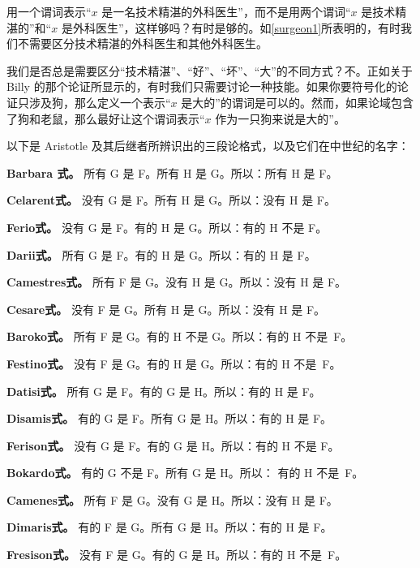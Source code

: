 用一个谓词表示“$x$ 是一名技术精湛的外科医生”，而不是用两个谓词“$x$ 是技术精湛的”和“$x$ 是外科医生”，这样够吗？有时是够的。如\cref{surgeon1}所表明的，有时我们不需要区分技术精湛的外科医生和其他外科医生。

我们是否总是需要区分“技术精湛”、“好”、“坏”、“大”的不同方式？不。正如关于 Billy 的那个论证所显示的，有时我们只需要讨论一种技能。如果你要符号化的论证只涉及狗，那么定义一个表示“$x$ 是大的”的谓词是可以的。然而，如果论域包含了狗和老鼠，那么最好让这个谓词表示“$x$ 作为一只狗来说是大的”。

\practiceproblems
\problempart
{}\label{pr.BarbaraEtc}
以下是 Aristotle 及其后继者所辨识出的三段论格式，以及它们在中世纪的名字：

\begin{compactlist}
	\item \textbf{Barbara 式。} 所有 G 是 F。所有 H 是 G。所以：所有 H 是 F。
	\item \textbf{Celarent式。} 没有 G 是 F。所有 H 是 G。所以：没有 H 是 F。
	\item \textbf{Ferio式。} 没有 G 是 F。有的 H 是 G。所以：有的 H 不是 F。
	\item \textbf{Darii式。} 所有 G 是 F。有的 H 是 G。所以：有的 H 是 F。
	\item \textbf{Camestres式。} 所有 F 是 G。没有 H 是 G。所以：没有 H 是 F。
	\item \textbf{Cesare式。} 没有 F 是 G。所有 H 是 G。所以：没有 H 是 F。
	\item \textbf{Baroko式。} 所有 F 是 G。有的 H 不是 G。所以：有的 H 不是~F。
	\item \textbf{Festino式。} 没有 F 是 G。有的 H 是 G。所以：有的 H 不是~F。
	\item \textbf{Datisi式。} 所有 G 是 F。有的 G 是 H。所以：有的 H 是 F。
	\item \textbf{Disamis式。} 有的 G 是 F。所有 G 是 H。所以：有的 H 是 F。
	\item \textbf{Ferison式。} 没有 G 是 F。有的 G 是 H。所以：有的 H 不是 F。
	\item \textbf{Bokardo式。} 有的 G 不是 F。所有 G 是 H。所以： 有的 H 不是~F。
	\item \textbf{Camenes式。} 所有 F 是 G。没有 G 是 H。所以：没有 H 是 F。
	\item \textbf{Dimaris式。} 有的 F 是 G。所有 G 是 H。所以：有的 H 是 F。
	\item \textbf{Fresison式。} 没有 F 是 G。有的 G 是 H。所以：有的 H 不是~F。
\end{compactlist}

